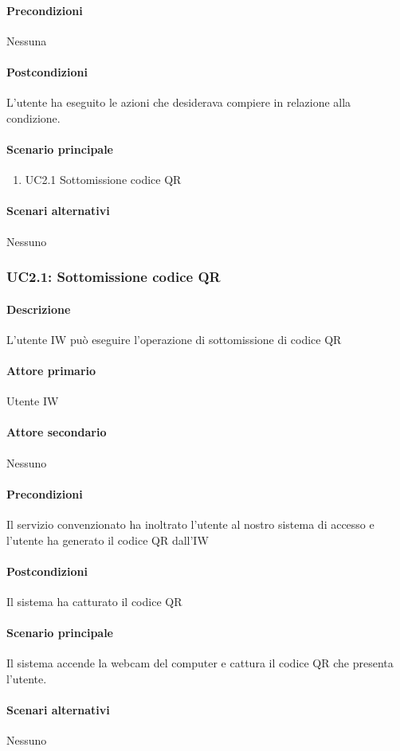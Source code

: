 \paragraph{Precondizioni} Nessuna
\paragraph{Postcondizioni}  L’utente ha eseguito le azioni che desiderava compiere in relazione alla condizione.
\paragraph{Scenario principale}  
    \begin{enumerate}
        \item UC2.1 Sottomissione codice QR
    \end{enumerate}
\paragraph{Scenari alternativi}  Nessuno






\subsubsection{UC2.1: Sottomissione codice QR}
\paragraph{Descrizione}  L’utente IW può eseguire l’operazione di sottomissione di codice QR
\paragraph{Attore primario}  Utente IW
\paragraph{Attore secondario}  Nessuno
\paragraph{Precondizioni} Il servizio convenzionato ha inoltrato l’utente al nostro sistema di accesso e l’utente ha generato il codice QR dall’IW
\paragraph{Postcondizioni} Il sistema ha catturato il codice QR
\paragraph{Scenario principale}  
Il sistema accende la webcam del computer e cattura il codice QR che presenta l’utente.
\paragraph{Scenari alternativi}  Nessuno